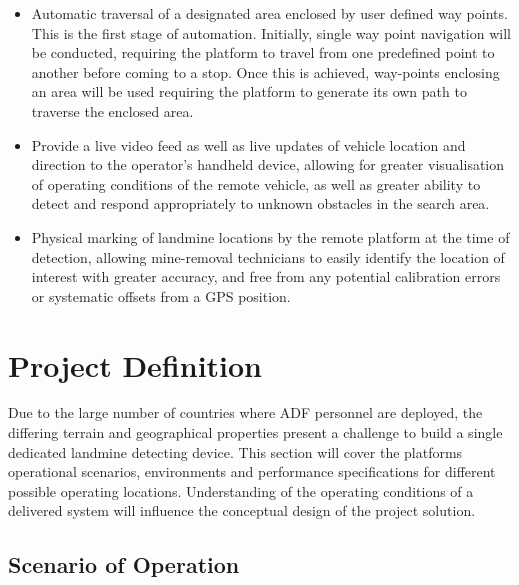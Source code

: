 \documentclass[main.tex]{subfiles}
\begin{document}
\begin{itemize}
\item Automatic traversal of a designated area enclosed by user defined way points. This is the first stage of automation. Initially, single way point navigation will be conducted, requiring the platform to travel from one predefined point to another before coming to a stop. Once this is achieved, way-points enclosing an area will be used requiring the platform to generate its own path to traverse the enclosed area.
\item Provide a live video feed as well as live updates of vehicle location and direction to the operator's handheld device, allowing for greater visualisation of operating conditions of the remote vehicle, as well as greater ability to detect and respond appropriately to unknown obstacles in the search area.
\item Physical marking of landmine locations by the remote platform at the time of detection, allowing mine-removal technicians to easily identify the location of interest with greater accuracy, and free from any potential calibration errors or systematic offsets from a GPS position.
\end{itemize}

\section{Project Definition}
Due to the large number of countries where ADF personnel are deployed, the differing terrain and geographical properties present a challenge to build a single dedicated landmine detecting device. This section will cover the platforms operational scenarios, environments and performance specifications for different possible operating locations. Understanding of the operating conditions of a delivered system will influence the conceptual design of the project solution.
\subsection{Scenario of Operation}
\end{document}
